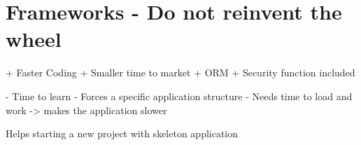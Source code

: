\section{Frameworks - Do not reinvent the wheel}

+ Faster Coding
+ Smaller time to market
+ ORM
+ Security function included

- Time to learn
- Forces a specific application structure
- Needs time to load and work -> makes the application slower


Helps starting a new project with skeleton application